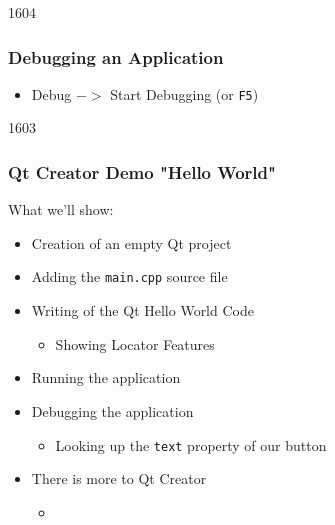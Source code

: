 \begin{slide}{1604}
  \frametitle{Debugging an Application}
  \begin{itemize}
  \item Debug $->$ Start Debugging (or \texttt{F5})
  \end{itemize}
\end{slide}

\begin{slide}{1603}
  \frametitle{Qt Creator Demo "Hello World"}
  What we'll show:
  \begin{itemize}
  \item Creation of an empty Qt project
  \item Adding the \texttt{main.cpp} source file
  \item Writing of the Qt Hello World Code
    \begin{itemize}
    \item Showing Locator Features
    \end{itemize}
  \item Running the application
  \item Debugging the application
    \begin{itemize}
    \item Looking up the \texttt{text} property of our button
    \end{itemize}
  \end{itemize}
  \medskip
  \begin{itemize}
  \item There is more to Qt Creator
    \begin{itemize}
    \item[] 
    \end{itemize}
  \end{itemize}
\end{slide}


